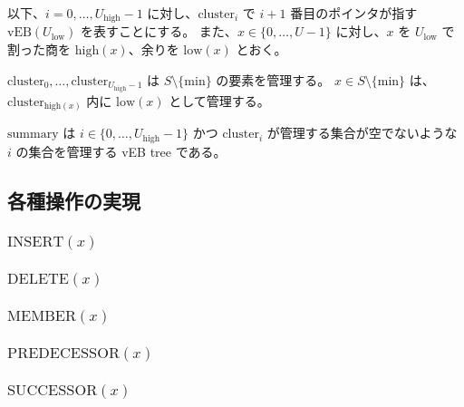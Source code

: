 \documentclass[dvipdfmx,a4j,10pt]{jarticle}
\begin{document}
以下、$i = 0, \dots, U_{\mathrm{high}} - 1$ に対し、$\mathrm{cluster}_i$ で $i + 1$ 番目のポインタが指す $\mathrm{vEB}(U_{\mathrm{low}})$ を表すことにする。
また、$x \in \{0, \dots, U - 1\}$ に対し、$x$ を $U_{\mathrm{low}}$ で割った商を $\mathrm{high}(x)$、余りを $\mathrm{low}(x)$ とおく。

$\mathrm{cluster}_0, \dots, \mathrm{cluster}_{U_{\mathrm{high}} - 1}$ は $S \setminus \{\mathrm{min}\}$ の要素を管理する。
$x \in S \setminus \{\mathrm{min}\}$ は、$\mathrm{cluster}_{\mathrm{high}(x)}$ 内に $\mathrm{low}(x)$ として管理する。

$\mathrm{summary}$ は $i \in \{0, \dots, U_{\mathrm{high}} - 1\}$ かつ $\mathrm{cluster}_i$ が管理する集合が空でないような $i$ の集合を管理する vEB tree である。

\subsection{各種操作の実現}

\subsubsection{$\mathrm{INSERT}(x)$}

\subsubsection{$\mathrm{DELETE}(x)$}

\subsubsection{$\mathrm{MEMBER}(x)$}

\subsubsection{$\mathrm{PREDECESSOR}(x)$}

\subsubsection{$\mathrm{SUCCESSOR}(x)$}
\end{document}
